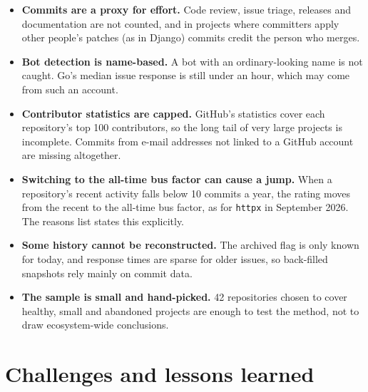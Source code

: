 \documentclass[11pt,a4paper]{report}
\begin{document}
\begin{itemize}
  \item \textbf{Commits are a proxy for effort.} Code review, issue triage,
        releases and documentation are not counted, and in projects where
        committers apply other people's patches (as in Django) commits credit
        the person who merges.
  \item \textbf{Bot detection is name-based.} A bot with an ordinary-looking
        name is not caught. Go's median issue response is still under an hour,
        which may come from such an account.
  \item \textbf{Contributor statistics are capped.} GitHub's statistics cover
        each repository's top 100 contributors, so the long tail of very large
        projects is incomplete. Commits from e-mail addresses not linked to a
        GitHub account are missing altogether.
  \item \textbf{Switching to the all-time bus factor can cause a jump.} When a
        repository's recent activity falls below 10 commits a year, the rating
        moves from the recent to the all-time bus factor, as for \texttt{httpx}
        in September 2026. The reasons list states this explicitly.
  \item \textbf{Some history cannot be reconstructed.} The archived flag is
        only known for today, and response times are sparse for older issues,
        so back-filled snapshots rely mainly on commit data.
  \item \textbf{The sample is small and hand-picked.} 42 repositories chosen to
        cover healthy, small and abandoned projects are enough to test the
        method, not to draw ecosystem-wide conclusions.
\end{itemize}

\section{Challenges and lessons learned}
\end{document}
